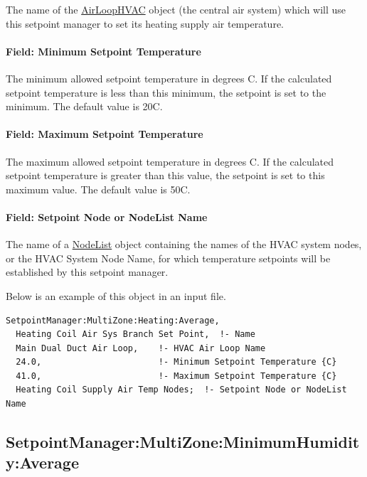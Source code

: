 The name of the \hyperref[airloophvac]{AirLoopHVAC} object (the central air system) which will use this setpoint manager to set its heating supply air temperature.

\paragraph{Field: Minimum Setpoint Temperature}\label{field-minimum-setpoint-temperature-5}

The minimum allowed setpoint temperature in degrees C. If the calculated setpoint temperature is less than this minimum, the setpoint is set to the minimum. The default value is 20C.

\paragraph{Field: Maximum Setpoint Temperature}\label{field-maximum-setpoint-temperature-5}

The maximum allowed setpoint temperature in degrees C. If the calculated setpoint temperature is greater than this value, the setpoint is set to this maximum value. The default value is 50C.

\paragraph{Field: Setpoint Node or NodeList Name}\label{field-setpoint-node-or-nodelist-name-14}

The name of a \hyperref[nodelist]{NodeList} object containing the names of the HVAC system nodes, or the HVAC System Node Name, for which temperature setpoints will be established by this setpoint manager.

Below is an example of this object in an input file.

\begin{lstlisting}
SetpointManager:MultiZone:Heating:Average,
  Heating Coil Air Sys Branch Set Point,  !- Name
  Main Dual Duct Air Loop,    !- HVAC Air Loop Name
  24.0,                       !- Minimum Setpoint Temperature {C}
  41.0,                       !- Maximum Setpoint Temperature {C}
  Heating Coil Supply Air Temp Nodes;  !- Setpoint Node or NodeList Name
\end{lstlisting}

\subsection{SetpointManager:MultiZone:MinimumHumidity:Average}\label{setpointmanagermultizoneminimumhumidityaverage}

